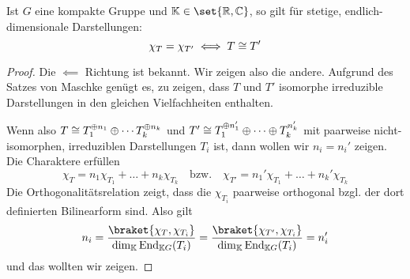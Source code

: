 \begin{corollary}
Ist $G$ eine kompakte Gruppe und $\IK\in\set{\IR,\IC}$, so gilt für stetige, endlich-dimensionale Darstellungen:
\[\chi_T = \chi_{T'} \iff T \cong T'\]
\end{corollary}
\begin{proof}
Die $\impliedby$ Richtung ist bekannt. Wir zeigen also die andere. Aufgrund des Satzes von Maschke genügt es, zu zeigen, dass $T$ und $T'$ isomorphe irreduzible Darstellungen in den gleichen Vielfachheiten enthalten.

Wenn also $T \cong T_1 ^{\oplus n_1} \oplus \cdots T_k^{\oplus n_k}$ und $T' \cong T_1^{\oplus n_1'} \oplus \cdots \oplus T_k^{n_k'}$ mit paarweise nicht-isomorphen, irreduziblen Darstellungen $T_i$ ist, dann wollen wir $n_i=n_i'$ zeigen. Die Charaktere erfüllen
\[\chi_T = n_1 \chi_{T_1} + \ldots + n_k\chi_{T_k} \quad\text{bzw.}\quad \chi_{T'} = n_1' \chi_{T_1} + \ldots + n_k' \chi_{T_k}\] 
Die Orthogonalitätsrelation zeigt, dass die $\chi_{T_i}$ paarweise orthogonal bzgl. der dort definierten Bilinearform sind. Also gilt
\[n_i = \frac{\braket{\chi_T, \chi_{T_i}}}{\dim_\IK \End_{\IK G}(T_i)} = \frac{\braket{\chi_{T'}, \chi_{T_i}}}{\dim_\IK \End_{\IK G}(T_i)} = n_i'\]
und das wollten wir zeigen.
\end{proof}
